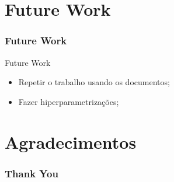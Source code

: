 \section{Future Work}
\begin{frame}
	\frametitle{Future Work}
	\begin{block}{Future Work} 
		\begin{itemize}
			\item Repetir o trabalho usando os documentos;
			\item Fazer hiperparametrizações;
		\end{itemize}
	\end{block}
\end{frame}



\section*{Agradecimentos}
\begin{frame}
	\frametitle{Thank You}



\end{frame}

















